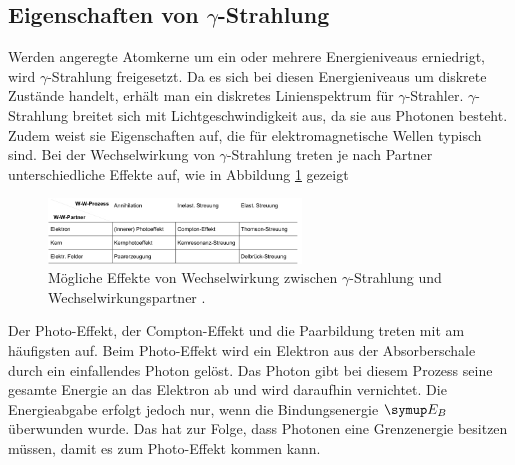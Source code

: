 \subsection{\texorpdfstring{Eigenschaften von $\gamma$}{(Eigenschaften von gamma)}-Strahlung}
Werden angeregte Atomkerne um ein oder mehrere Energieniveaus erniedrigt, wird
$\gamma$-Strahlung freigesetzt. Da es sich bei diesen Energieniveaus um diskrete
Zustände handelt, erhält man ein diskretes Linienspektrum für $\gamma$-Strahler.
$\gamma$-Strahlung breitet sich mit Lichtgeschwindigkeit aus, da sie aus Photonen
besteht. Zudem weist sie Eigenschaften auf, die für elektromagnetische Wellen
typisch sind.
Bei der Wechselwirkung von $\gamma$-Strahlung treten je nach Partner
unterschiedliche Effekte auf, wie in Abbildung \ref{fig:ww} gezeigt
\begin{figure}[H]
  \centering
  \includegraphics[width=0.6\textwidth]{bilder/wechselgamma.jpg}
  \caption{Mögliche Effekte von Wechselwirkung zwischen $\gamma$-Strahlung
  und Wechselwirkungspartner \cite{704}.}
  \label{fig:ww}
\end{figure}
Der Photo-Effekt, der Compton-Effekt und die Paarbildung treten mit am häufigsten
auf.
Beim Photo-Effekt wird ein Elektron aus der Absorberschale durch ein einfallendes
Photon gelöst. Das Photon gibt bei diesem Prozess seine gesamte Energie an das
Elektron ab und wird daraufhin vernichtet. Die Energieabgabe erfolgt jedoch nur,
wenn die Bindungsenergie $\su{E_B}$ überwunden wurde. Das hat zur Folge, dass
Photonen eine Grenzenergie besitzen müssen, damit es zum Photo-Effekt kommen kann.

